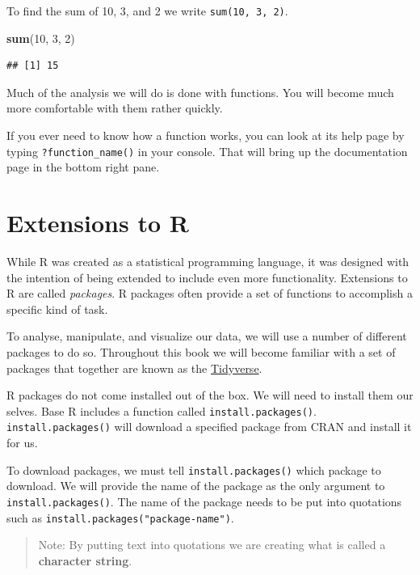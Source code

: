 \documentclass[
]{book}
\newenvironment{Shaded}{\begin{snugshade}}{\end{snugshade}}
\newcommand{\DecValTok}[1]{\textcolor[rgb]{0.00,0.00,0.81}{#1}}
\newcommand{\KeywordTok}[1]{\textcolor[rgb]{0.13,0.29,0.53}{\textbf{#1}}}
\newcommand{\NormalTok}[1]{#1}
\begin{document}
To find the sum of 10, 3, and 2 we write \texttt{sum(10,\ 3,\ 2)}.

\begin{Shaded}
\begin{Highlighting}[]
\KeywordTok{sum}\NormalTok{(}\DecValTok{10}\NormalTok{, }\DecValTok{3}\NormalTok{, }\DecValTok{2}\NormalTok{)}
\end{Highlighting}
\end{Shaded}

\begin{verbatim}
## [1] 15
\end{verbatim}

Much of the analysis we will do is done with functions. You will become much more comfortable with them rather quickly.

If you ever need to know how a function works, you can look at its help page by typing \texttt{?function\_name()} in your console. That will bring up the documentation page in the bottom right pane.

\hypertarget{extensions-to-r}{%
\section{Extensions to R}\label{extensions-to-r}}

While R was created as a statistical programming language, it was designed with the intention of being extended to include even more functionality. Extensions to R are called \emph{packages}. R packages often provide a set of functions to accomplish a specific kind of task.

To analyse, manipulate, and visualize our data, we will use a number of different packages to do so. Throughout this book we will become familiar with a set of packages that together are known as the \href{https://tidyverse.org}{Tidyverse}.

R packages do not come installed out of the box. We will need to install them our selves. Base R includes a function called \texttt{install.packages()}. \texttt{install.packages()} will download a specified package from CRAN and install it for us.

To download packages, we must tell \texttt{install.packages()} which package to download. We will provide the name of the package as the only argument to \texttt{install.packages()}. The name of the package needs to be put into quotations such as \texttt{install.packages("package-name")}.

\begin{quote}
Note: By putting text into quotations we are creating what is called a \textbf{character string}.
\end{quote}
\end{document}
